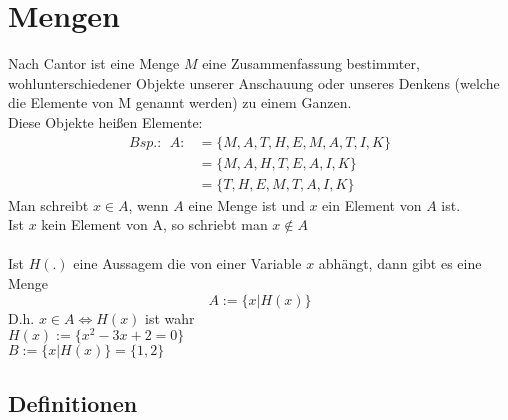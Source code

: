 \documentclass{article}
\begin{document}
    \section{Mengen}
        Nach Cantor ist eine Menge $M$ eine Zusammenfassung bestimmter, wohlunterschiedener Objekte unserer Anschauung oder unseres Denkens (welche die Elemente von M genannt werden) zu einem Ganzen.\\
        Diese Objekte heißen Elemente:
        \begin{align*}
            Bsp.: \:\:A:&=\{M,A,T,H,E,M,A,T,I,K\}\\
            \,&=\{M,A,H,T,E,A,I,K\}\\
            \,&=\{T,H,E,M,T,A,I,K\}
        \end{align*}
        Man schreibt $x\in A $, wenn $A$ eine Menge ist und $x$ ein Element von $A$ ist.\\
        Ist $x$ kein Element von A, so schriebt man $x\notin A$\\\\
        Ist $H(.)$ eine Aussagem die von einer Variable $x$ abhängt, dann gibt es eine Menge 
        $$A:=\{x|H(x)\}$$
        D.h. $x\in A\iff H(x)$ ist wahr\\

        $H(x):=\{x^2-3x+2=0\}$\\
        $B:=\{x|H(x)\}=\{1,2\}$\\
        \subsection*{Definitionen}
\end{document}
